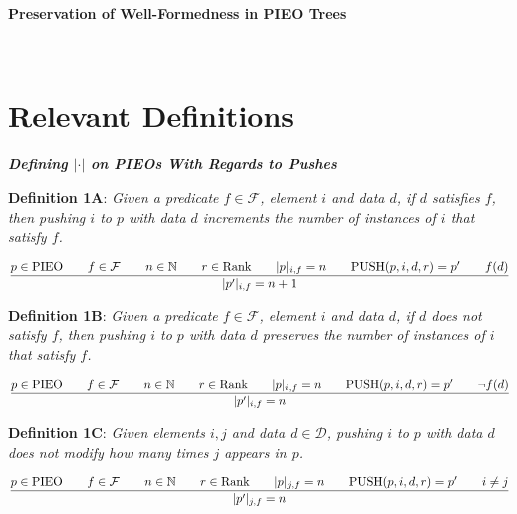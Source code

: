 \documentclass{amsart}
\begin{document}
\pagestyle{empty}

{\LARGE \textbf{Preservation of Well-Formedness in PIEO Trees}}

\hrulefill\\

\section{Relevant Definitions}

\textbf{\textit{Defining $| \cdot |$ on PIEOs With Regards to Pushes}}\newline


\textbf{Definition 1A}: \textit{Given a predicate $f \in \mathcal{F}$, element $i$ and data $d$, if $d$ satisfies $f$, then pushing $i$ to $p$ with data $d$ increments the number of instances of $i$ that satisfy $f$.}

$$\frac{p \in \text{PIEO}  \hspace{0.7cm} f \in \mathcal{F} \hspace{0.7cm} n \in \mathbb{N} \hspace{0.7cm} r \in \text{Rank} \hspace{0.7cm} |p|_{i, f} = n \hspace{0.7cm} \text{PUSH}(p, i, d, r) = p' \hspace{0.7cm} f(d)}{|p'|_{i, f} = n+1}$$

\textbf{Definition 1B}: \textit{Given a predicate $f \in \mathcal{F}$, element $i$ and data $d$, if $d$ does not satisfy $f$, then pushing $i$ to $p$ with data $d$ preserves the number of instances of $i$ that satisfy $f$.}

$$\frac{p \in \text{PIEO}  \hspace{0.7cm} f \in \mathcal{F} \hspace{0.7cm} n \in \mathbb{N} \hspace{0.7cm} r \in \text{Rank} \hspace{0.7cm} |p|_{i, f} = n \hspace{0.7cm} \text{PUSH}(p, i, d, r) = p' \hspace{0.7cm} \neg f(d)}{|p'|_{i, f} = n}$$

\textbf{Definition 1C}: \textit{Given elements $i, j$ and data $d \in \mathcal{D}$, pushing $i$ to $p$ with data $d$ does not modify how many times $j$ appears in $p$.}

$$\frac{p \in \text{PIEO}  \hspace{0.7cm} f \in \mathcal{F} \hspace{0.7cm} n \in \mathbb{N} \hspace{0.7cm} r \in \text{Rank} \hspace{0.7cm} |p|_{j, f} = n \hspace{0.7cm} \text{PUSH}(p, i, d, r) = p' \hspace{0.7cm} i \neq j}{|p'|_{j, f} = n}$$
\end{document}
